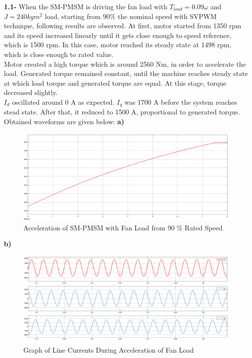 \documentclass{article}
\newcommand\tab[1][1cm]{\hspace*{#1}}
\begin{document}
\textbf{1.1-} When the SM-PMSM is driving the fan load with $T_{load}=0.09 \omega $ and $J=240 kg m^2$ load, starting from $90 \% $ the nominal speed with SVPWM technique, following results are observed. At first, motor started from 1350 rpm and its speed increased linearly until it gets close enough to speed reference, which is 1500 rpm. In this case, motor reached its steady state at 1498 rpm, which is close enough to rated value. \\
\tab Motor created a high torque which is around 2560 Nm, in order to accelerate the load. Generated torque remained constant, until the machine reaches steady state at which load torque and generated torque are equal. At this stage, torque decreased slightly. \\
\tab $I_d$ oscillated around 0 A as expected. $I_q$ was 1700 A before the system reaches stead state. After that, it reduced to 1500 A, proportional to generated torque. Obtained waveforms are given below:
\textbf{a)}
\begin{figure}[H]
    \centering
    \includegraphics[scale=0.2]{q1a.png}
    \caption{Acceleration of SM-PMSM with Fan Load from 90 \% Rated Speed }
    \label{fig:my_label}
\end{figure}
\newpage
\textbf{b)}
\begin{figure}[H]
    \centering
    \includegraphics[scale=0.2]{q1_line currents.png}
    \caption{Graph of Line Currents During Acceleration of Fan Load}
    \label{fig:my_label}
\end{figure}
\end{document}

